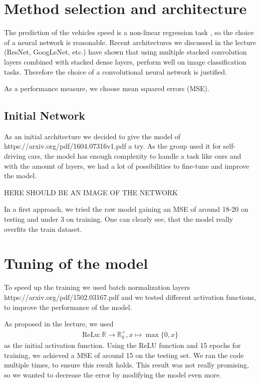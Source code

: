 \documentclass[conference]{IEEEtran}
\begin{document}
\section{Method selection and architecture}
The prediction of the vehicles speed is a non-linear regression task , so the choice of a neural network is reasonable. 
Recent architectures we discussed in the lecture (ResNet, GoogLeNet, etc.) have shown that using multiple stacked convolution layers
combined with stacked dense layers, perform well on image classification tasks. Therefore the choice of a convolutional neural 
network is justified.

As a performance measure, we choose mean squared errors (MSE).

\subsection{Initial Network}

As an initial architecture we decided to give the model of https://arxiv.org/pdf/1604.07316v1.pdf a try. As the group used it
for self-driving cars, the model has enough complexity to handle a task like ours and with the amount of layers, we had a lot of
possibilities to fine-tune and improve the model.

HERE SHOULD BE AN IMAGE OF THE NETWORK

In a first approach, we tried the raw model gaining an MSE of around 18-20 on testing and under 3 on training. One can clearly see,
that the model really overfits the train dataset.

\section{Tuning of the model}
To speed up the training we used batch normalization layers https://arxiv.org/pdf/1502.03167.pdf and we tested different activation functions, to improve the performance of the model. 

As proposed in the lecture, we used
\begin{align*}
\mathrm{ReLu}: \mathbb{R} \to \mathbb{R}_0^+, x \mapsto \max\{0,x\}
\end{align*}
as the initial activation function. Using the ReLU function and 15 epochs for training, we achieved a MSE of around 15 on the 
testing set. We ran the 
code multiple times, to ensure this result holds. This result was not really promising, so we wanted to decrease the error by 
modifying the model even more.
\end{document}
